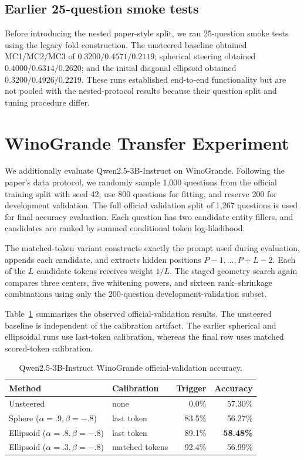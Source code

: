 \documentclass[11pt]{article}
\begin{document}
\subsection{Earlier 25-question smoke tests}

Before introducing the nested paper-style split, we ran 25-question smoke
tests using the legacy fold construction.  The unsteered baseline obtained
MC1/MC2/MC3 of $0.3200/0.4571/0.2119$; spherical steering obtained
$0.4000/0.6314/0.2620$; and the initial diagonal ellipsoid obtained
$0.3200/0.4926/0.2219$.  These runs established end-to-end functionality but
are not pooled with the nested-protocol results because their question split
and tuning procedure differ.

\section{WinoGrande Transfer Experiment}

We additionally evaluate Qwen2.5-3B-Instruct on WinoGrande. Following the
paper's data protocol, we randomly sample 1,000 questions from the official
training split with seed 42, use 800 questions for fitting, and reserve 200 for
development validation. The full official validation split of 1,267 questions
is used for final accuracy evaluation. Each question has two candidate entity
fillers, and candidates are ranked by summed conditional token
log-likelihood.

The matched-token variant constructs exactly the prompt used during
evaluation, appends each candidate, and extracts hidden positions
$P-1,\ldots,P+L-2$. Each of the $L$ candidate tokens receives weight $1/L$.
The staged geometry search again compares three centers, five whitening
powers, and sixteen rank--shrinkage combinations using only the 200-question
development-validation subset.

Table~\ref{tab:wino-results} summarizes the observed official-validation
results. The unsteered baseline is independent of the calibration artifact.
The earlier spherical and ellipsoidal runs use last-token calibration, whereas
the final row uses matched scored-token calibration.

\begin{table}[ht]
\centering
\caption{Qwen2.5-3B-Instruct WinoGrande official-validation accuracy.}
\label{tab:wino-results}
\begin{tabular}{llrr}
\toprule
Method & Calibration & Trigger & Accuracy\\
\midrule
Unsteered & none & 0.0\% & 57.30\%\\
Sphere ($\alpha=.9,\beta=-.8$) & last token & 83.5\% & 56.27\%\\
Ellipsoid ($\alpha=.8,\beta=-.8$) & last token & 89.1\% & \textbf{58.48\%}\\
Ellipsoid ($\alpha=.3,\beta=-.8$) & matched tokens & 92.4\% & 56.99\%\\
\bottomrule
\end{tabular}
\end{table}
\end{document}
